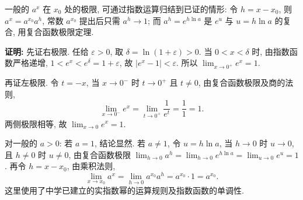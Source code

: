 \documentclass[UTF8,openany]{ctexbook}
\theoremstyle{chinesetextbook}
\newenvironment{cnproof}{\par\indent\textbf{证明:} \ignorespaces}{\par}
\begin{document}
一般的 $a^x$ 在 $x_0$ 处的极限, 可通过指数运算归结到已证的情形: 令 $h=x-x_0$, 则 $a^x=a^{x_0}a^h$, 常数 $a^{x_0}$ 提出后只需 $a^h\to1$; 而 $a^h=e^{h\ln a}$ 是 $e^u$ 与 $u=h\ln a$ 的复合, 用复合函数极限定理.
\begin{cnproof}
先证右极限. 任给 $\varepsilon>0$, 取 $\delta=\ln(1+\varepsilon)>0$. 当 $0<x<\delta$ 时, 由指数函数严格递增, $1<e^x<e^{\delta}=1+\varepsilon$, 故 $|e^x-1|<\varepsilon$. 所以 $\displaystyle\lim_{x\to0^+}e^x=1$.

再证左极限. 令 $t=-x$, 当 $x\to0^-$ 时 $t\to0^+$ 且 $t\ne0$, 由复合函数极限及商的法则,
\[
\lim_{x\to0^-}e^x=\lim_{t\to0^+}\frac1{e^t}=\frac1{1}=1.
\]
两侧极限相等, 故 $\displaystyle\lim_{x\to0}e^x=1$.

对一般的 $a>0$: 若 $a=1$, 结论显然. 若 $a\ne1$, 令 $u=h\ln a$, 当 $h\to0$ 时 $u\to0$, 且 $h\ne0$ 时 $u\ne0$, 由复合函数极限 $\displaystyle\lim_{h\to0}a^h=\lim_{h\to0}e^{h\ln a}=\lim_{u\to0}e^u=1$. 再令 $h=x-x_0$, 由乘积法则,
\[
\lim_{x\to x_0}a^x=\lim_{h\to0}a^{x_0}a^h=a^{x_0}\cdot1=a^{x_0}.
\]
这里使用了中学已建立的实指数幂的运算规则及指数函数的单调性.
\end{cnproof}
\end{document}
